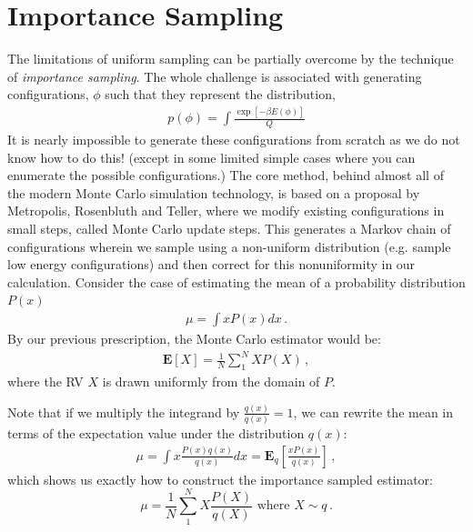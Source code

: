 \documentclass[book.tex]{subfiles}
\begin{document}
\section{Importance Sampling}

The limitations of uniform sampling can be partially overcome by the technique of \textit{importance sampling}.  The whole challenge is associated with generating configurations, $\phi$ such that they represent the distribution, 
\begin{align}p(\phi) = \int \frac{\exp[-\beta E(\phi)]}{Q}\end{align}  
It is nearly impossible to generate these configurations from scratch as we do not know how to do this! (except in some limited simple cases where you can enumerate the possible configurations.)  The core method, behind almost all of the modern Monte Carlo simulation technology, is based on a proposal by Metropolis, Rosenbluth and Teller, where we modify existing configurations in small steps, called Monte Carlo update steps. This generates a Markov chain of configurations wherein we sample using a non-uniform distribution (e.g. sample low energy configurations) and then correct for this nonuniformity in our calculation. Consider the case of estimating the mean of a probability distribution $P(x)$
\begin{align}
     \mu = \int xP(x)dx\,.
 \end{align}
By our previous prescription, the Monte Carlo estimator would be:
\begin{align}
    \mathbf{E}[X] = \frac{1}{N}\sum_1^N X P(X)\,,
\end{align}
where the RV $X$ is drawn uniformly from the domain of $P$.

Note that if we multiply the integrand by $\frac{q(x)}{q(x)}=1$, we can rewrite the mean in terms of the expectation value under the distribution $q(x)$:
\begin{align}
\mu = \int x\frac{P(x)q(x)}{q(x)}dx=\mathbf{E}_q\left[\frac{xP(x)}{q(x)}\right]\,,
\end{align}
which shows us exactly how to construct the importance sampled estimator:
\begin{equation}
     \mu = \frac1N\sum_1^NX\frac{P(X)}{q(X)}\text{ where } X\sim q\,.
\end{equation}
\end{document}
